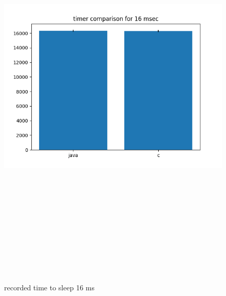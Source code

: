 \documentclass{article}
\begin{document}
    \begin{figure}[H]
    	\centering
    	\includegraphics[width=17cm,height=20cm,keepaspectratio]{AsyncMonitorCompares/sleep-timer_java-vs-c/time-compare-16.png}
    	\caption{recorded time to sleep 16 ms}
    	\label{fig:xalan-fix-PKG}
    \end{figure}
\end{document}
